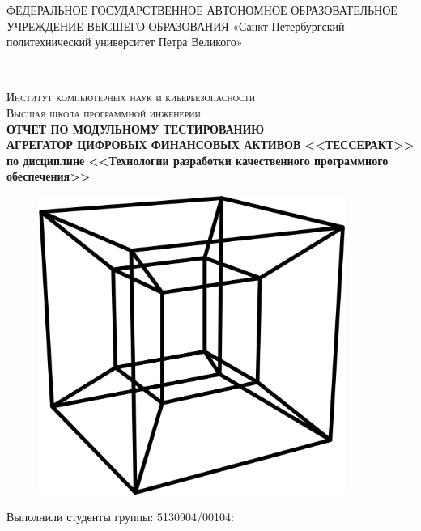 \documentclass[a4paper, 14pt]{article}
\begin{document}
\begin{titlepage}
    \center

    ФЕДЕРАЛЬНОЕ ГОСУДАРСТВЕННОЕ АВТОНОМНОЕ ОБРАЗОВАТЕЛЬНОЕ УЧРЕЖДЕНИЕ ВЫСШЕГО ОБРАЗОВАНИЯ\linebreak
    «Санкт-Петербургский политехнический университет Петра Великого»
    \noindent\rule{500pt}{0.8pt} \\
    \textsc{\Large Институт компьютерных наук и кибербезопасности}\\
    \textsc{\large Высшая школа программной инженерии}\\[1.5cm]

    { \huge \bfseries ОТЧЕТ ПО МОДУЛЬНОМУ ТЕСТИРОВАНИЮ	\\
    \Large \mdseries АГРЕГАТОР ЦИФРОВЫХ ФИНАНСОВЫХ АКТИВОВ <<ТЕССЕРАКТ>> \\
    \large по дисциплине <<Технологии разработки качественного программного обеспечения>>}\\
    \flushright{
        {\phantom{qwe}}\\[1.0cm]
    }

    \begin{figure}[H]
        \centering
        \includegraphics[width=10cm]{./resources/1.png}\\[2.0cm]
    \end{figure}

    \begin{multicols}{2}
        \begin{flushright} \large

            {Выполнили студенты группы: 5130904/00104:}\\
            {\phantom{qwe}}\\
            {\phantom{qwe}}\\
            {\phantom{qwe}}\\
            {\phantom{qwe}}\\


\end{flushright}
\end{multicols}
\end{titlepage}
\end{document}
